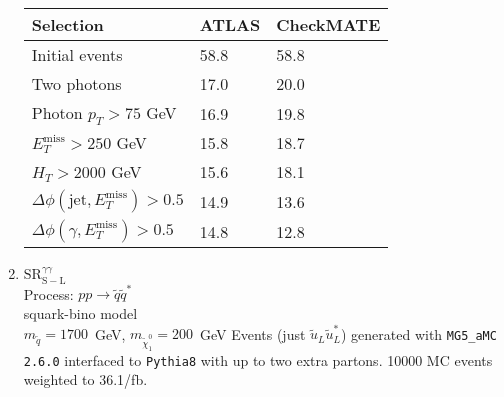 \documentclass[12pt,fleqn]{article}
\begin{document}
\begin{enumerate}
\begin{table}[h!] 
 \renewcommand*{\arraystretch}{1.2}
 \begin{tabular}{l|p{3cm}|p{3cm}} \toprule
  Selection                                                                       & ATLAS    & CheckMATE       \\ \midrule
  Initial events                                                                  & 58.8     &  58.8          \\
  Two photons                                                                     & 17.0     &  20.0 \\
  Photon $p_T>75$ GeV                                                             & 16.9     &  19.8 \\
  $E_T^\mathrm{miss} > 250$ GeV                                                   & 15.8     &  18.7 \\
  $H_T > 2000$ GeV                                                                & 15.6     &  18.1  \\ 
  $\Delta\phi(\mathrm{jet},E_T^\mathrm{miss}) > 0.5$                              & 14.9     &  13.6  \\  
  $\Delta\phi(\gamma,E_T^\mathrm{miss}) > 0.5$                                    & 14.8     &  12.8  \\ \bottomrule
 \end{tabular}
\end{table} 

\newpage
\item{$\mathrm{SR}^{\gamma\gamma}_{\mathrm{S-L}}$\\}
 Process: $ p p \to \tilde{q} \tilde{q}^*$\\
 squark-bino model\\
 $m_{\tilde{q}} = 1700$~GeV, $m_{\tilde{\chi}_1^0} = 200$~GeV
 Events (just $\tilde{u}_L\tilde{u}_L^*$) generated with \texttt{MG5\_aMC 2.6.0} interfaced to \texttt{Pythia8} with up to two extra partons.
 10000 MC events weighted to 36.1/fb.


\end{enumerate}
\end{document}
